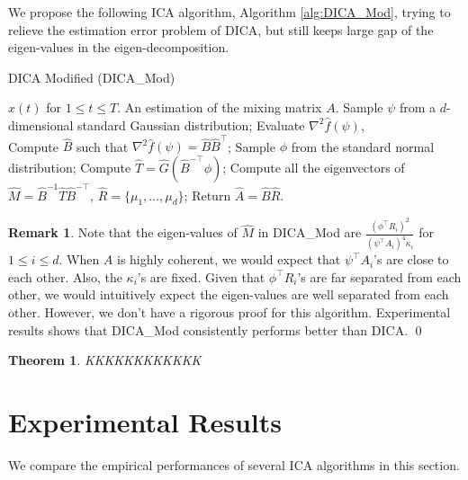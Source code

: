 \documentclass[twoside]{article}
\newtheorem{thm}[lemma]{Theorem}
\theoremstyle{definition}
\newtheorem{remark}[lemma]{Remark}
\begin{document}
We propose the following ICA algorithm, Algorithm \ref{alg:DICA_Mod}, trying to relieve the estimation error problem of DICA, but still keeps large gap of the eigen-values in the eigen-decomposition. 
\begin{algorithm} 
\caption{DICA Modified (DICA\_Mod)}
\label{alg:DICA_Mod}
\begin{algorithmic}[1]
\INPUT $x(t)$ for $1\le t \le T$. 
\OUTPUT An estimation of the mixing matrix $A$. 
\STATE Sample $\psi$ from a $d$-dimensional standard Gaussian distribution;
\STATE Evaluate $\nabla^2\widehat{f}(\psi)$, \\
\STATE Compute $\widehat{B}$ such that $\nabla^2\widehat{f}(\psi) = \widehat{B}\widehat{B}^{\top}$;
\STATE Sample $\phi$ from the standard normal distribution;
\STATE Compute $\widehat{T} = \widehat{G}(\widehat{B}^{-\top}\phi)$;
\STATE Compute all the eigenvectors of $\widehat{M} = \widehat{B}^{-1}\widehat{T}\widehat{B}^{-\top}$, $\widehat{R} = \{\mu_1,\ldots,\mu_d\}$;
\STATE Return $\widehat{A} = \widehat{B}\widehat{R}$.
\end{algorithmic}
\end{algorithm}
\begin{remark}
Note that the eigen-values of $\widehat{M}$ in DICA\_Mod are $\frac{(\phi^{\top}R_i)^2}{(\psi^{\top}A_i)^4\kappa_i}$ for $1\le i\le d$. 
When $A$ is highly coherent, we would expect that $\psi^{\top}A_i$'s are close to each other. Also, the $\kappa_i$'s are fixed. 
Given that $\phi^{\top}R_i$'s are far separated from each other, we would intuitively expect the eigen-values are well separated from each other. 
However, we don't have a rigorous proof for this algorithm.
Experimental results shows that DICA\_Mod consistently performs better than DICA. \qed
\end{remark}
\begin{thm}
KKKKKKKKKKKK
\end{thm}
\section{Experimental Results}
\label{sec:ExpRes}
We compare the empirical performances of several ICA algorithms in this section. 
\end{document}
